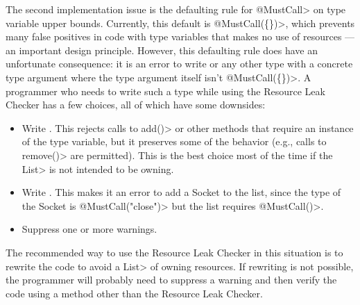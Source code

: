 The second implementation issue is the defaulting rule for \<@MustCall> on
type variable upper bounds.  Currently, this default is \<@MustCall(\{\})>,
which prevents many false positives in code with type variables that makes
no use of resources --- an important design principle.
However, this defaulting rule does have an unfortunate consequence: it is
an error to write  or any other type with a concrete
type argument where the type argument itself isn't \<@MustCall(\{\})>. A programmer who
needs to write such a type while using the Resource Leak Checker has a few
choices, all of which have some downsides:

\begin{itemize}
\item Write . This rejects calls to \<add()>
or other methods that require an instance of the type variable, but it
preserves some of the behavior (e.g., calls to \<remove()> are permitted).
This is the best choice most of the time if the \<List> is not intended to
be owning.
\item Write . This makes it an error to
add a Socket to the list, since the type of the Socket is
\<@MustCall("close")> but the list requires \<@MustCall()>.
\item Suppress one or more warnings.
\end{itemize}

The recommended way to use the Resource Leak Checker in this situation is
to rewrite the code to avoid a \<List> of owning resources. If rewriting is
not possible, the programmer will probably need to suppress a warning and
then verify the code using a method other than the Resource Leak Checker.

